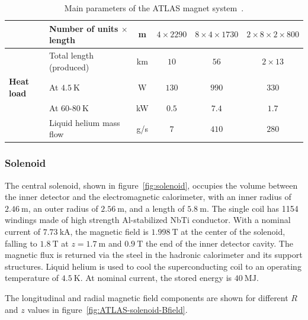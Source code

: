 \begin{table}[htbp]
\begin{tabular}{|l|l|c|c|c|c|}
		\hline
		 & Number of units $\times$ length & m & $4\times 2290$ & $8\times 4 \times 1730$ & $2\times8\times2\times800$ \\
		\hline
		 & Total length (produced) & km & $10$ & $56$ & $2\times13$ \\
		\hline
		\textbf{Heat load} & At $4.5~\mbox{K}$ & W & $130$ & $990$ & $330$ \\
		\hline
		 & At $60$-$80~\mbox{K}$ & kW & $0.5$ & $7.4$ & $1.7$ \\
		\hline
		 & Liquid helium mass flow & g/s & $7$ & $410$ & $280$ \\
		\hline
	\end{tabular}
	\caption{Main parameters of the ATLAS magnet system~\cite{TheATLASCollaboration:2008fg}.}
	\label{table:ATLAS-magnet-parameters}
\end{table}




\subsubsection{Solenoid}\label{sec:ATLAS-magnets-solenoid}

The central solenoid, shown in figure~\ref{fig:solenoid}, occupies the volume between the inner detector and the electromagnetic calorimeter, with an inner radius of $\SI{2.46}{\meter}$, an outer radius of $\SI{2.56}{\meter}$, and a length of $\SI{5.8}{\meter}$. The single coil has 1154 windings made of high strength Al-stabilized NbTi conductor. With a nominal current of $\SI{7.73}{\kilo\ampere}$, the magnetic field is $\SI{1.998}{\tesla}$ at the center of the solenoid, falling to $\SI{1.8}{\tesla}$ at $z=\SI{1.7}{\meter}$ and $\SI{0.9}{\tesla}$ the end of the inner detector cavity.  The magnetic flux is returned via the steel in the hadronic calorimeter and its support structures. Liquid helium is used to cool the superconducting coil to an operating temperature of $\SI{4.5}{\kelvin}$. At nominal current, the stored energy is $\SI{40}{\mega\joule}$. 

The longitudinal and radial magnetic field components are shown for different $R$ and $z$ values in figure~\ref{fig:ATLAS-solenoid-Bfield}.

